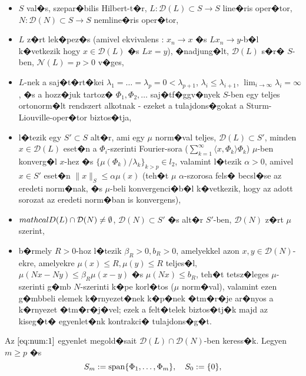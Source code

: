 \begin{itemize}
\item $S$ val�s, szepar�bilis Hilbert-t�r, $L : \mathcal{D}(L) \subset S \rightarrow S$ line�ris oper�tor, $N : \mathcal{D}(N) \subset S \rightarrow S$ nemline�ris oper�tor,
\item $L$ z�rt lek�pez�s (amivel ekvivalens \cite{funkanal}: $x_n \rightarrow x$ �s $Lx_n \rightarrow y$-b�l k�vetkezik hogy $x \in \mathcal{D}(L)$ �s $Lx = y$), �nadjung�lt, $\mathcal{D}(L)$ s�r� $S$-ben, $\mathcal{N}(L) = p > 0$ v�ges,
\item $L$-nek a saj�t�rt�kei $\lambda_1 = \dots = \lambda_p = 0 < \lambda_{p + 1}$, $\lambda_i \leq \lambda_{i + 1}$, $\lim_{i \to \infty} \lambda_i = \infty$, �s a hozz�juk tartoz� $\Phi_1, \Phi_2, \dots$ saj�tf�ggv�nyek $S$-ben egy teljes ortonorm�lt rendszert alkotnak - ezeket a tulajdons�gokat a Sturm-Liouville-oper�tor biztos�tja,
\item l�tezik egy $S' \subset S$ alt�r, ami egy $\mu$ norm�val teljes, $\mathcal{D}(L) \subset S'$, minden $x \in \mathcal{D}(L)$ eset�n a $\Phi_i$-szerinti Fourier-sora ($\sum_{k=1}^\infty \langle x, \Phi_k \rangle \Phi_k$) $\mu$-ben konverg�l $x$-hez �s $\{ \mu(\Phi_k) / \lambda_k\}_{k > p} \in l_2$, valamint l�tezik $\alpha > 0$, amivel $x \in S'$ eset�n $\|x\|_S \leq \alpha \mu(x)$ (teh�t $\mu$ $\alpha$-szorosa fels� becsl�se az eredeti norm�nak, �s $\mu$-beli konvergenci�b�l k�vetkezik, hogy az adott sorozat az eredeti norm�ban is konvergens),
\item $\\mathcal{D}(L) \cap \mathcal{D}(N) \neq \emptyset$, $\mathcal{D}(N) \subset S'$ �s alt�r $S'$-ben, $\mathcal{D}(N)$ z�rt $\mu$ szerint,
\item b�rmely $R > 0$-hoz l�tezik $\beta_R > 0, b_R > 0$, amelyekkel azon $x, y \in \mathcal{D}(N)$-ekre, amelyekre $\mu(x) \leq R, \mu(y) \leq R$ teljes�l, $\mu(Nx - Ny) \leq \beta_R \mu(x - y)$ �s $\mu(Nx) \leq b_R$, teh�t tetsz�leges $\mu$-szerinti g�mb $N$-szerinti k�pe korl�tos ($\mu$ norm�val), valamint ezen g�mbbeli elemek k�rnyezet�nek k�p�nek �tm�r�je ar�nyos a k�rnyezet �tm�r�j�vel; ezek a felt�telek biztos�tj�k majd az kiseg�t� egyenlet�nk kontrakci� tulajdons�g�t. %
\end{itemize}
Az $\eqref{eq:num:1}$ egyenlet megold�sait $\mathcal{D}(L) \cap \mathcal{D}(N)$-ben keress�k. Legyen $m \geq p$ �s
\begin{equation*}
S_m := \mathop{\mathrm{span}} \{\Phi_1, \dots, \Phi_m \}, \quad S_0 := \{ 0\},
\end{equation*}
